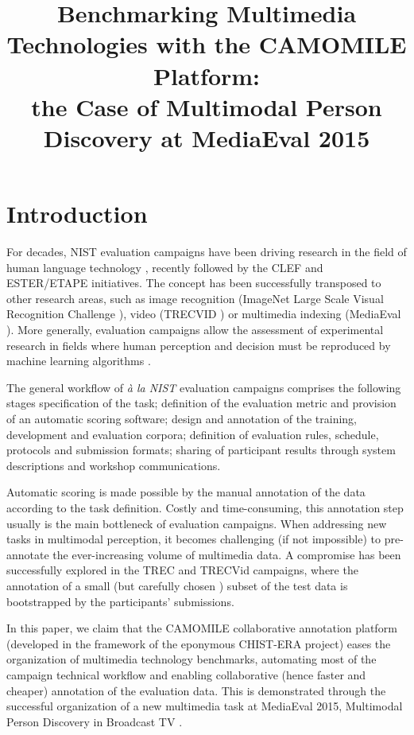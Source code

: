 \documentclass[10pt, a4paper]{article}
\title{Benchmarking Multimedia Technologies with the CAMOMILE Platform:\\the Case of Multimodal Person Discovery at MediaEval 2015}
\begin{document}
\maketitleabstract

\section{Introduction}

For decades, NIST evaluation campaigns have been driving research in the field
of human language technology \cite{Martin2004}, recently followed by the CLEF \cite{Peters2002} and
ESTER/ETAPE \cite{Gravier2004} initiatives. The concept has been successfully transposed to
other research areas, such as image recognition (ImageNet Large Scale Visual
Recognition Challenge \cite{Russakovsky2015}), video (TRECVID \cite{Smeaton2006}) or multimedia indexing
(MediaEval \cite{Larson2015}). More generally, evaluation campaigns allow the assessment of
experimental research in fields where human perception and decision must be
reproduced by machine learning algorithms \cite{Geoffrois2008}.

The general workflow of \textit{à la NIST} evaluation campaigns comprises the
following stages \cite{Martin2004} specification of the task; definition of the evaluation
metric and provision of an automatic scoring software; design and annotation of
the training, development and evaluation corpora; definition of evaluation
rules, schedule, protocols and submission formats; sharing of participant
results through system descriptions and workshop communications.

Automatic scoring is made possible by the manual annotation of the data
according to the task definition. Costly and time-consuming, this annotation
step usually is the main bottleneck of evaluation campaigns. When addressing
new tasks in multimodal perception, it becomes challenging (if not impossible)
to pre-annotate the ever-increasing volume of multimedia data. A compromise
has been successfully explored in the TREC and TRECVid campaigns, where
the annotation of a small (but carefully chosen \cite{Yilmaz2006}) subset of the test data is
bootstrapped by the participants' submissions.

In this paper, we claim that the CAMOMILE collaborative annotation platform
(developed in the framework of the eponymous CHIST-ERA project) eases the
organization of multimedia technology benchmarks, automating most of the
campaign technical workflow and enabling collaborative (hence faster and
cheaper) annotation of the evaluation data. This is demonstrated through the
successful organization of a new multimedia task at MediaEval 2015, Multimodal
Person Discovery in Broadcast TV \cite{Poignant2015}.
\end{document}
